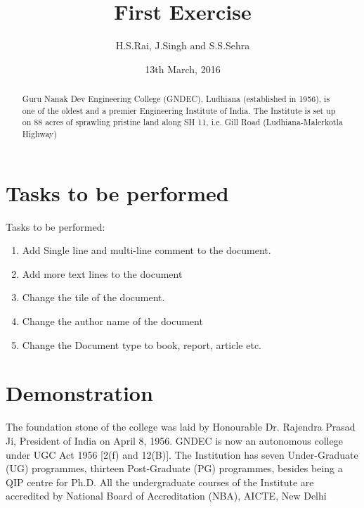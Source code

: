 \documentclass[12pt, letterpaper, twoside]{article}
\title{First Exercise}
\author{H.S.Rai, J.Singh and S.S.Sehra}
\date{13th March, 2016}
\begin{document}
\maketitle
\section*{Tasks to be performed}
Tasks to be performed:
\begin{enumerate}
	\item Add Single line and multi-line comment to the document.
    \item Add more text lines to the document
    \item Change the tile of the document.
   \item Change the author name of the document
   \item Change the Document type to book, report, article etc.
\end{enumerate}
\section*{Demonstration}


\begin{abstract}
Guru Nanak Dev Engineering College (GNDEC), Ludhiana (established in
1956), is one of the oldest and a premier Engineering Institute of India. The
Institute is set up on 88 acres of sprawling pristine land along SH 11, i.e. Gill
Road (Ludhiana-Malerkotla Highway)
\end{abstract}

 The foundation stone of the college
 was laid by Honourable Dr. Rajendra Prasad Ji, President of India on April 8,
 1956. GNDEC is now an autonomous college under UGC Act 1956 [2(f) and
 12(B)]. The Institution has seven Under-Graduate (UG) programmes,
 thirteen Post-Graduate (PG) programmes, besides being a QIP centre for
 Ph.D. All the undergraduate courses of the Institute are accredited by
 National Board of Accreditation (NBA), AICTE, New Delhi
 
\end{document}
